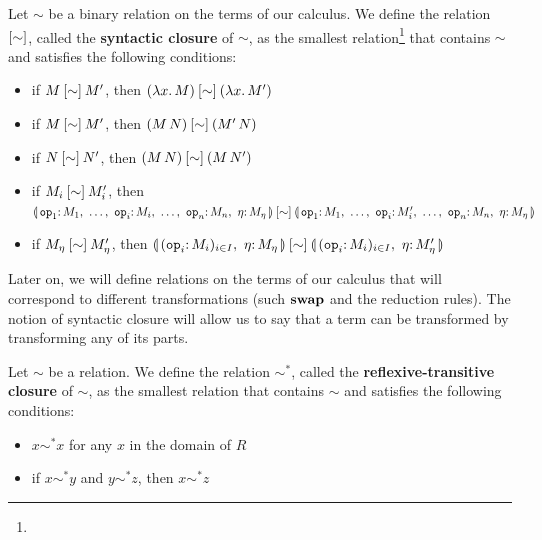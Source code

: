 \begin{definition}
  Let $\sim$ be a binary relation on the terms of our calculus. We define
  the relation $\mathbin{[\sim]}$, called the \textbf{syntactic closure} of
  $\sim$, as the smallest relation\footnote{} that contains $\sim$ and satisfies
  the following conditions:

  \begin{itemize}
  \item if $M \mathbin{[\sim]} M'$, then $(\lambda x.\, M) \mathbin{[\sim]} (\lambda x.\, M')$
  \item if $M \mathbin{[\sim]} M'$, then $(M\,N) \mathbin{[\sim]} (M'\,N)$
  \item if $N \mathbin{[\sim]} N'$, then $(M\,N) \mathbin{[\sim]} (M\,N')$
  \item if $M_i \mathbin{[\sim]} M_i'$, then $\banana{\onto{\op{op}_1}
    M_1,\ \dots,\ \onto{\op{op}_i} M_i,\ \dots,\ \onto{\op{op}_n}
    M_n,\ \onto{\eta}{M_\eta}} \syntclos{\sim} \banana{\onto{\op{op}_1}
    M_1,\ \dots,\ \onto{\op{op}_i} M_i',\ \dots,\ \onto{\op{op}_n}
    M_n,\ \onto{\eta} M_\eta}$
  \item if $M_\eta \mathbin{[\sim]} M_\eta'$, then
    $\cibanana \syntclos{\sim}
     \banana{(\onto{\op{op}_i}{M_i})_{i \in I},\ \onto{\eta}{M_\eta'}}$
  \end{itemize}
\end{definition}

Later on, we will define relations on the terms of our calculus that will
correspond to different transformations (such $\mathbin{\textbf{swap}}$ and the reduction
rules). The notion of syntactic closure will allow us to say that a term
can be transformed by transforming any of its parts.

\begin{definition}
  Let $\sim$ be a relation. We define the relation $\sim^*$, called the
  \textbf{reflexive-transitive closure} of $\sim$, as the smallest relation
  that contains $\sim$ and satisfies the following conditions:

  \begin{itemize}
  \item $x \sim^* x$ for any $x$ in the domain of $R$
  \item if $x \sim^* y$ and $y \sim^* z$, then $x \sim^* z$
  \end{itemize}
\end{definition}

